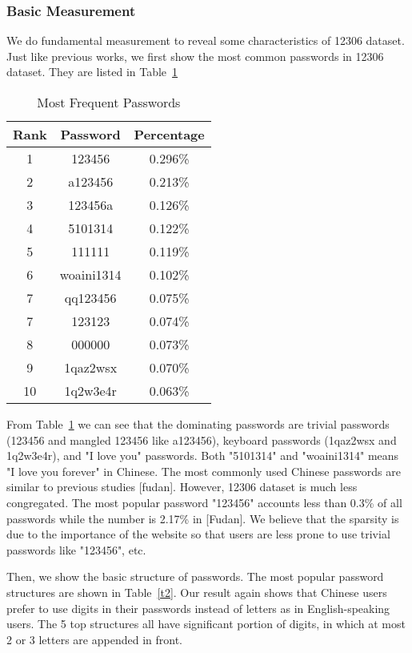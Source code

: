 \documentclass{sig-alternate}
\begin{document}
\subsubsection{Basic Measurement}
We do fundamental measurement to reveal some characteristics of 12306 dataset. Just like previous works, we first show the most common passwords in 12306 dataset. They are listed in Table~\ref{t1}
\begin{table}
\centering
\caption{Most Frequent Passwords}
\begin{tabular}{|c|c|c|} \hline
Rank&Password&Percentage\\ \hline
1 & 123456 & 0.296\%\\ \hline
2 & a123456 & 0.213\%\\ \hline
3 & 123456a & 0.126\%\\ \hline
4 & 5101314 & 0.122\%\\ \hline
5 & 111111 & 0.119\%\\ \hline
6 & woaini1314 & 0.102\%\\ \hline
7 & qq123456 & 0.075\%\\ \hline
7 & 123123 & 0.074\%\\ \hline
8 & 000000 & 0.073\%\\ \hline
9 & 1qaz2wsx & 0.070\%\\ \hline
10 & 1q2w3e4r & 0.063\%\\ 
\hline\end{tabular}

\label{t1}
\end{table}
From Table~\ref{t1} we can see that the dominating passwords are trivial passwords (123456 and mangled 123456 like a123456), keyboard passwords (1qaz2wsx and 1q2w3e4r), and "I love you" passwords. Both "5101314" and "woaini1314" means "I love you forever" in Chinese. The most commonly used Chinese passwords are similar to previous studies [fudan]. However, 12306 dataset is much less congregated. The most popular password "123456" accounts less than 0.3\% of all passwords while the number is 2.17\% in [Fudan]. We believe that the sparsity is due to the importance of the website so that users are less prone to use trivial passwords like "123456", etc. 

Then, we show the basic structure of passwords. The most popular password structures are shown in Table~\ref{t2}. Our result again shows that Chinese users prefer to use digits in their passwords instead of letters as in English-speaking users. The 5 top structures all have significant portion of digits, in which at most 2 or 3 letters are appended in front.
\end{document}
